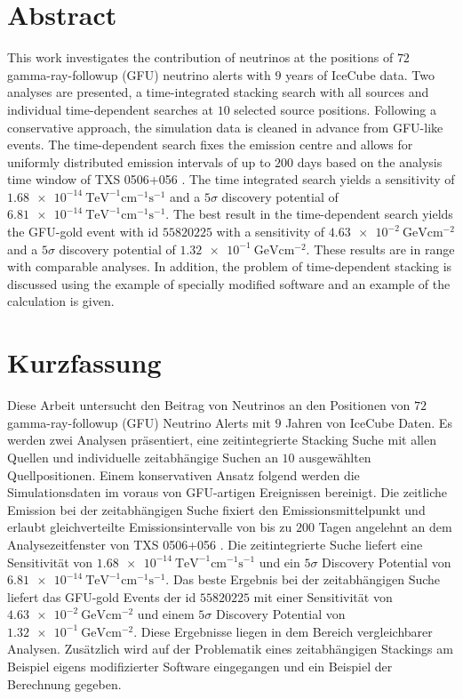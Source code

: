 \section*{Abstract}

This work investigates the contribution of neutrinos at the positions of $\num{72}$ gamma-ray-followup (GFU) neutrino alerts with $\num{9}$ years of IceCube data.
Two analyses are presented, a time-integrated stacking search with all sources and individual time-dependent searches at $\num{10}$ selected source positions.
Following a conservative approach, the simulation data is cleaned in advance from GFU-like events.
The time-dependent search fixes the emission centre and allows for uniformly distributed emission intervals of up to $\num{200}$ days based on the analysis time window of TXS 0506+056 \cite{_txs}.
The time integrated search yields a sensitivity of $\SI{1.68e-14}{\tera\electronvolt\tothe{-1}\centi\meter\tothe{-1}\second\tothe{-1}}$ and a $\num{5}\sigma$ discovery potential of $\SI{6.81e-14}{\tera\electronvolt\tothe{-1}\centi\meter\tothe{-1}\second\tothe{-1}}$.
The best result in the time-dependent search yields the GFU-gold event with id $\num{55820225}$ with a sensitivity of $\SI{4.63e-2}{\giga\electronvolt\centi\meter\tothe{-2}}$ and a $\num{5}\sigma$ discovery potential of $\SI{1.32e-1}{\giga\electronvolt\centi\meter\tothe{-2}}$.
These results are in range with comparable analyses.
In addition, the problem of time-dependent stacking is discussed using the example of specially modified software and an example of the calculation is given.

\section*{Kurzfassung}

Diese Arbeit untersucht den Beitrag von Neutrinos an den Positionen von $\num{72}$ gamma-ray-followup (GFU) Neutrino Alerts mit $\num{9}$ Jahren von IceCube Daten.
Es werden zwei Analysen präsentiert, eine zeitintegrierte Stacking Suche mit allen Quellen und individuelle zeitabhängige Suchen an $\num{10}$ ausgewählten Quellpositionen.
Einem konservativen Ansatz folgend werden die Simulationsdaten im voraus von GFU-artigen Ereignissen bereinigt.
Die zeitliche Emission bei der zeitabhängigen Suche fixiert den Emissionsmittelpunkt und erlaubt gleichverteilte Emissionsintervalle von bis zu $\num{200}$ Tagen angelehnt an dem Analysezeitfenster von TXS 0506+056 \cite{_txs}.
Die zeitintegrierte Suche liefert eine Sensitivität von $\SI{1.68e-14}{\tera\electronvolt\tothe{-1}\centi\meter\tothe{-1}\second\tothe{-1}}$ und ein $\num{5}\sigma$ Discovery Potential von $\SI{6.81e-14}{\tera\electronvolt\tothe{-1}\centi\meter\tothe{-1}\second\tothe{-1}}$.
Das beste Ergebnis bei der zeitabhängigen Suche liefert das GFU-gold Events der id $\num{55820225}$ mit einer Sensitivität von $\SI{4.63e-2}{\giga\electronvolt\centi\meter\tothe{-2}}$ und einem $\num{5}\sigma$ Discovery Potential von $\SI{1.32e-1}{\giga\electronvolt\centi\meter\tothe{-2}}$.
Diese Ergebnisse liegen in dem Bereich vergleichbarer Analysen.
Zusätzlich wird auf der Problematik eines zeitabhängigen Stackings am Beispiel eigens modifizierter Software eingegangen und ein Beispiel der Berechnung gegeben.
